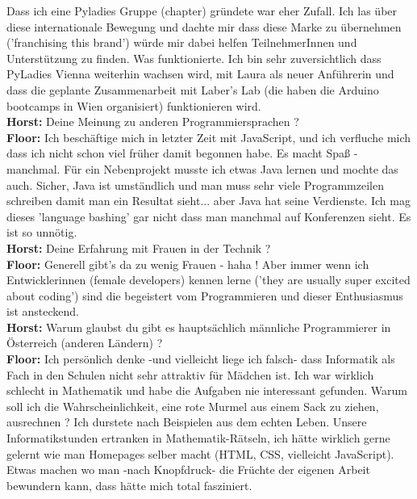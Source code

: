 \documentclass[10pt,a4paper,ngerman,twoside]{article} %
\begin{document}
\begin{multicols}{3}
Dass ich eine Pyladies Gruppe (chapter) gründete war eher Zufall. Ich las über diese internationale Bewegung und dachte mir dass diese Marke zu übernehmen ('franchising this brand') würde mir dabei helfen TeilnehmerInnen und Unterstützung zu finden. Was funktionierte.
Ich bin sehr zuversichtlich dass PyLadies Vienna weiterhin wachsen wird, mit Laura als neuer Anführerin und dass die geplante Zusammenarbeit mit Laber's Lab (die haben die Arduino bootcamps in Wien organisiert) funktionieren wird. \\
\textbf{Horst:} Deine Meinung zu anderen Programmiersprachen ? \\
\textbf{Floor:} Ich beschäftige mich in letzter Zeit mit JavaScript, und ich verfluche mich dass ich nicht schon viel früher damit begonnen habe. Es macht Spaß - manchmal. Für ein Nebenprojekt musste ich etwas Java lernen und mochte das auch. Sicher, Java ist umständlich und man muss sehr viele Programmzeilen schreiben damit man ein Resultat sieht... aber Java hat seine Verdienste. Ich mag dieses 'language bashing' gar nicht dass man manchmal auf Konferenzen sieht. Es ist so unnötig. \\
\textbf{Horst:} Deine Erfahrung mit Frauen in der Technik ? \\
\textbf{Floor:} Generell gibt's da zu wenig Frauen - haha ! Aber immer wenn ich Entwicklerinnen (female developers) kennen lerne ('they are usually super excited about coding') sind die begeistert vom Programmieren und dieser Enthusiasmus ist ansteckend. \\
\textbf{Horst:} Warum glaubst du gibt es hauptsächlich männliche Programmierer in Österreich (anderen Ländern) ? \\
\textbf{Floor:} Ich persönlich denke -und vielleicht liege ich falsch- dass Informatik als Fach in den Schulen nicht sehr attraktiv für Mädchen ist. Ich war wirklich schlecht in Mathematik und habe die Aufgaben nie interessant gefunden. Warum soll ich die Wahrscheinlichkeit, eine rote Murmel aus einem Sack zu ziehen, ausrechnen ? Ich durstete nach Beispielen aus dem echten Leben. Unsere Informatikstunden ertranken in Mathematik-Rätseln, ich hätte wirklich gerne gelernt wie man Homepages selber macht (HTML, CSS, vielleicht JavaScript). Etwas machen wo man -nach Knopfdruck- die Früchte der eigenen Arbeit bewundern kann, dass hätte mich total fasziniert. 


\end{multicols}
\end{document}
